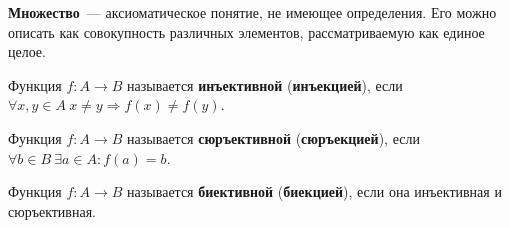  \textbf{Множество}~--- аксиоматическое понятие, не имеющее определения.
Его можно описать как совокупность различных элементов, рассматриваемую как единое целое.

 Функция $f \colon A \to B$ называется \textbf{инъективной} (\textbf{инъекцией}), если
$\forall x, y \in A	\ x \neq y \Rightarrow f(x) \neq f(y)$.

 Функция $f \colon A \to B$ называется \textbf{сюръективной} (\textbf{сюръекцией}), если
$\forall b \in B \ \exists a \in A \colon f(a) = b$.

 Функция $f \colon A \to B$ называется \textbf{биективной} (\textbf{биекцией}), если она инъективная и сюръективная.